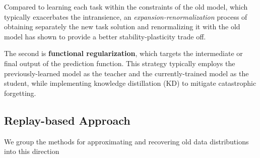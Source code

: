 Compared to learning each task within the constraints of the old model, which typically exacerbates the intransience, an \textit{expansion-renormalization} process of obtaining separately the new task solution and renormalizing it with the old model has shown to provide a better stability-plasticity trade off.

The second is \textbf{functional regularization}, which targets the intermediate or final output of the prediction function. This strategy typically employs the previously-learned model as the teacher and the currently-trained model as the student, while implementing knowledge distillation (KD) to mitigate catastrophic forgetting.

\subsection{Replay-based Approach}
We group the methods for approximating and recovering old data distributions into this direction 